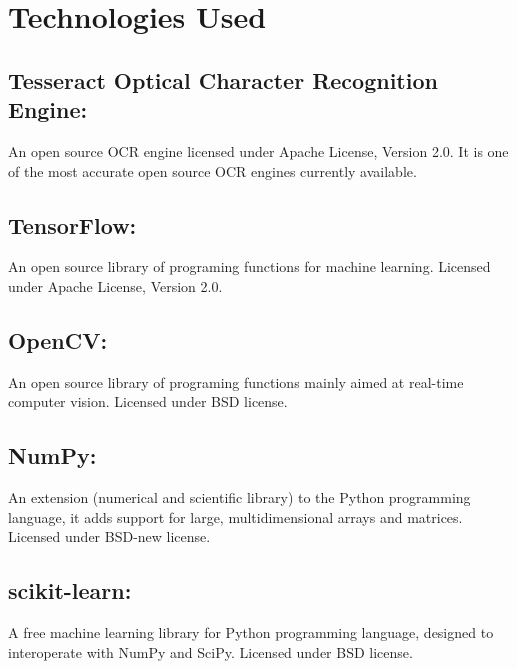 \chapter{Technologies Used}



\section{Tesseract Optical Character Recognition Engine:}
An open source OCR engine licensed under Apache License, Version 2.0\footnotemark. It is one of the most accurate open source OCR engines currently available.


\section{TensorFlow:}
	An open source library of programing functions for machine learning. Licensed under Apache License, Version 2.0\footnotemark[\value{footnote}].


\section{OpenCV:}
An open source library of programing functions mainly aimed at real-time computer vision. Licensed under BSD license\footnotemark.


\section{NumPy:}
	An extension (numerical and scientific library) to the Python programming language, it adds support for large, multidimensional arrays and matrices. Licensed under BSD-new license\footnotemark[\value{footnote}].


\section{scikit-learn:}
	A free machine learning library for Python programming language, designed to interoperate with NumPy and SciPy. Licensed under BSD license\footnotemark[\value{footnote}]. 



